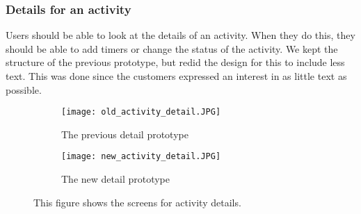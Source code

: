 \subsubsection{Details for an activity}
Users should be able to look at the details of an activity.
When they do this, they should be able to add timers or change the status of the activity.
We kept the structure of the previous prototype, but redid the design for this to include less text. 
This was done since the customers expressed an interest in as little text as possible.
\begin{figure}[H]
    \begin{subfigure}{0.5\textwidth}
    \texttt{[image: old\_activity\_detail.JPG]} 
    \caption{The previous detail prototype}
    \label{fig:old_activity_detail}
    \end{subfigure}
    \begin{subfigure}{0.5\textwidth}
        \texttt{[image: new\_activity\_detail.JPG]}
    \caption{The new detail prototype}
    \label{fig:new_activity_details}
    \end{subfigure} 
    \caption{This figure shows the screens for activity details.}
    \label{fig:activity_detail_prototypes}
\end{figure}

